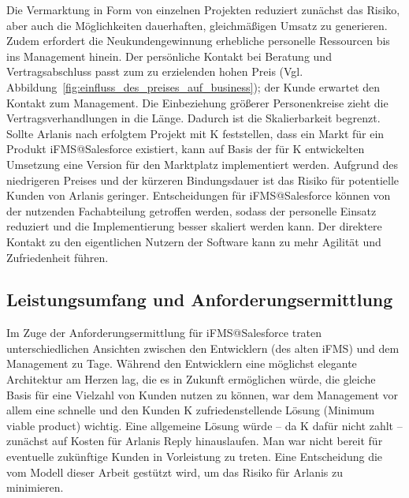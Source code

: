 Die Vermarktung in Form von einzelnen Projekten reduziert zunächst das Risiko, 
aber auch die Möglichkeiten dauerhaften, gleichmäßigen Umsatz zu generieren. 
Zudem erfordert die Neukundengewinnung erhebliche personelle Ressourcen bis ins 
Management hinein. Der persönliche Kontakt bei Beratung und Vertragsabschluss 
passt zum zu erzielenden hohen Preis (Vgl. 
Abbildung~\ref{fig:einfluss_des_preises_auf_business}); der Kunde erwartet den 
Kontakt zum Management. Die Einbeziehung größerer Personenkreise zieht die 
Vertragsverhandlungen in die Länge. Dadurch ist die Skalierbarkeit begrenzt. 
Sollte Arlanis nach erfolgtem Projekt mit K feststellen, dass ein Markt für ein 
Produkt iFMS@Salesforce existiert, kann auf Basis der für K entwickelten 
Umsetzung eine Version für den Marktplatz implementiert werden. Aufgrund des 
niedrigeren Preises und der kürzeren Bindungsdauer ist das Risiko für 
potentielle Kunden von Arlanis geringer. Entscheidungen für iFMS@Salesforce 
können von der nutzenden Fachabteilung getroffen werden, sodass der personelle 
Einsatz reduziert und die Implementierung besser skaliert werden kann. Der 
direktere Kontakt zu den eigentlichen Nutzern der Software kann zu mehr 
Agilität und Zufriedenheit führen.
\begin{comment}
Durch die Vermarktung als Projekt steigt für den Kunden die Investition und mit 
ihr das Risiko. In Folge werden -- anstatt das Produkt direkt an die 
Fachabteilungen zu vermarkten -- weiterhin in vielen Gremien langwierige 
Verhandlungen um den Leistungsumfang geführt, die in Lasten- und Pflichtenheften 
resultieren. Mit diesem Verlust an Agilität geht auch ein weiterer Verlust an 
Skalierbarkeit einher. Anstatt einem Kunden schnell die Lösung zu liefern und 
Umsätze zu generieren, muss der ISV erheblich in die Verhandlungen investieren, 
ohne das der Vertragsabschluss gesichert wäre.

Während eine personalintensive Wertschöpfung charakteristisch für 
Beratungsunternehmen ist, könnte Arlanis überdenken, ob der direkte Verkauf an 
Fachabteilungen durch Minderung des Risikos für den Kunden durch die 
Realisierung von Cloud-Vorteilen forciert werden könnte. 
\end{comment}

\subsection{Leistungsumfang und Anforderungsermittlung}
Im Zuge der Anforderungsermittlung für iFMS@Salesforce traten 
unterschiedlichen Ansichten zwischen den Entwicklern (des alten iFMS) und 
dem Management zu Tage. Während den Entwicklern eine möglichst elegante 
Architektur am Herzen lag, die es in Zukunft ermöglichen würde, die gleiche 
Basis für eine Vielzahl von Kunden nutzen zu können, war dem Management vor 
allem eine schnelle und den Kunden K zufriedenstellende Lösung (Minimum viable 
product) wichtig. Eine allgemeine Lösung würde -- da K dafür nicht zahlt -- 
zunächst auf Kosten für Arlanis Reply hinauslaufen. Man war nicht bereit für 
eventuelle zukünftige Kunden in Vorleistung zu treten. Eine Entscheidung die vom 
Modell dieser Arbeit gestützt wird, um das Risiko für Arlanis zu minimieren.

